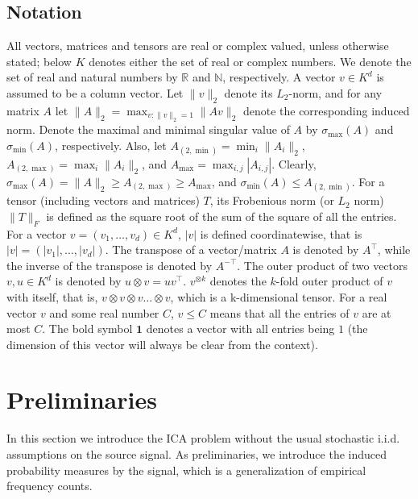 \documentclass[twoside]{article}
\newcommand{\real}{\mathbb{R}}
\renewcommand{\natural}{\mathbb{N}}
\theoremstyle{definition}
\begin{document}
\subsection{Notation}
All vectors, matrices and tensors are real or complex valued, unless otherwise stated; below $K$ denotes either the set of real or complex numbers. We denote the set of real and natural numbers by $\real$ and $\natural$, respectively.
A vector $v \in K^d$ is assumed to be a column vector.
Let $\|v\|_2$ denote its $L_2$-norm, and for any matrix $A$ let $\|A\|_2=\max_{v:\|v\|_2=1}{\|A v\|_2}$ denote the corresponding induced norm. Denote the maximal and minimal singular value of $A$ by $\sigma_{\max}(A)$ and  $\sigma_{\min}(A)$, respectively. Also, let $A_{(2,\min)} = \min_{i} \|A_i\|_2$, $A_{(2,\max)} = \max_{i} \|A_i\|_2$, and $A_{\max} = \max_{i,j} |A_{i,j}|$. 
Clearly, $\sigma_{\max}(A) =\|A\|_2 \ge A_{(2,\max)} \ge A_{\max}$, and $\sigma_{\min}(A) \le A_{(2,\min)}$. For a tensor (including vectors and matrices) $T$, its Frobenious norm (or $L_2$ norm) $\|T\|_F$  is defined as the square root of the sum of the square of all the entries.  
For a vector $v=(v_1,\ldots,v_d) \in K^d$, $\vert v \vert$ is defined coordinatewise, that is $\vert v \vert=(\vert v_1 \vert,\ldots,\vert v_d\vert)$. 
The transpose of a vector/matrix $A$ is denoted by $A^\top$, while the inverse of the transpose is denoted by $A^{-\top}$. 
The outer product of two vectors $v, u \in K^d$ is denoted by $u\otimes v=u v^\top$. 
$v^{\otimes k}$ denotes the $k$-fold outer product of $v$ with itself, that is, $v\otimes v\otimes v \ldots \otimes v$, which is a k-dimensional tensor.
For a real vector $v$ and some real number $C$, $v \le C$ means that all the entries of $v$ are at most $C$. 
The bold symbol $\boldsymbol{1}$ denotes a vector with all entries being $1$ (the dimension of this vector will always be clear from the context).




\section{Preliminaries}
\label{sec:Preliminaries}
In this section we introduce the ICA problem without the usual stochastic i.i.d.  assumptions on the source signal.
As preliminaries, we introduce the induced probability measures by the signal, which is a generalization of empirical 
frequency counts.
\end{document}

